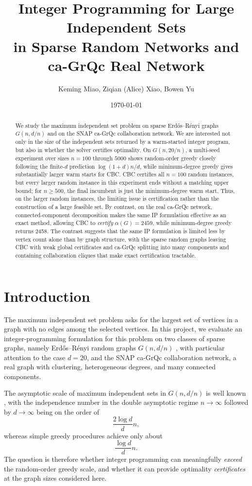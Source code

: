 \documentclass[11pt]{article}
\title{Integer Programming for Large Independent Sets\\in Sparse Random Networks and ca-GrQc Real Network}
\author{Keming Miao, Ziqian (Alice) Xiao, Bowen Yu}
\date{\today}
\begin{document}
\maketitle

\begin{abstract}
We study the maximum independent set problem on sparse Erdős--Rényi graphs
$G(n,d/n)$ and on the SNAP ca-GrQc collaboration network.  We are interested
not only in the size of the independent sets returned by a warm-started integer
program, but also in whether the solver certifies optimality.  On
$G(n,20/n)$, a multi-seed experiment over sizes $n=100$ through $5000$ shows
random-order greedy closely following the finite-$d$ prediction
$\log(1+d)n/d$, while minimum-degree greedy gives substantially larger warm
starts for CBC.  CBC certifies all $n=100$ random instances, but every larger
random instance in this experiment ends without a matching upper bound; for
$n\ge 500$, the final incumbent is just the minimum-degree warm start.  Thus,
on the larger random instances, the limiting issue is certification rather
than the construction of a large feasible set.
By contrast, on the real ca-GrQc network, connected-component decomposition
makes the same IP formulation effective as an exact method, allowing CBC to
\emph{certify} $\alpha(G)=2459$, while minimum-degree greedy returns 2458.  The contrast
suggests that the same IP formulation is limited less by vertex count alone
than by graph structure, with the sparse random graphs leaving CBC with weak
global certificates and ca-GrQc splitting into many components and containing
collaboration cliques that make exact certification tractable.
\end{abstract}

\section{Introduction}

The maximum independent set problem asks for the largest set of vertices in a
graph with no edges among the selected vertices.  In this project, we evaluate an
integer-programming formulation for this problem on two classes of sparse
graphs, namely Erdős--Rényi random graphs $G(n,d/n)$ \cite{erdosrenyi1959},
with particular attention to the case $d=20$, and the SNAP ca-GrQc
collaboration network, a real graph with clustering, heterogeneous degrees,
and many connected components.

The asymptotic scale of maximum independent sets in $G(n,d/n)$ is well known
\cite{coja2015}, with the independence number in the double asymptotic regime
$n\to\infty$ followed by $d\to\infty$ being on the order of
\[
\frac{2\log d}{d}n,
\]
whereas simple greedy procedures achieve only about
\[
\frac{\log d}{d}n.
\]
The question is therefore whether integer programming can meaningfully
\emph{exceed} the random-order greedy scale, and whether it can provide optimality
\emph{certificates} at the graph sizes considered here.
\end{document}
